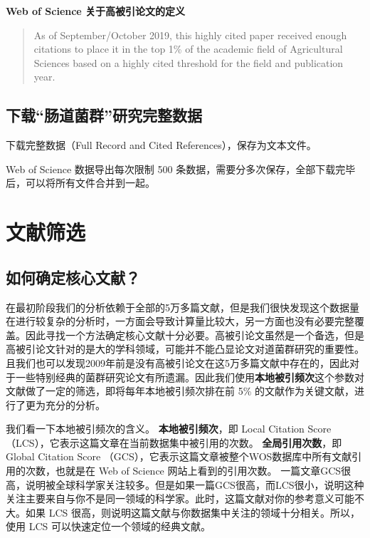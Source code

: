 \documentclass[]{ctexbook}
\begin{document}
\textbf{Web of Science 关于高被引论文的定义}

\begin{quote}
As of September/October 2019, this highly cited paper received enough citations to place it in the top 1\% of the academic field of Agricultural Sciences based on a highly cited threshold for the field and publication year.
\end{quote}

\hypertarget{ux4e0bux8f7dux80a0ux9053ux83ccux7fa4ux7814ux7a76ux5b8cux6574ux6570ux636e}{%
\section{下载``肠道菌群''研究完整数据}\label{ux4e0bux8f7dux80a0ux9053ux83ccux7fa4ux7814ux7a76ux5b8cux6574ux6570ux636e}}

下载完整数据（Full Record and Cited References），保存为文本文件。

Web of Science 数据导出每次限制 500 条数据，需要分多次保存，全部下载完毕后，可以将所有文件合并到一起。

\hypertarget{core-article}{%
\chapter{文献筛选}\label{core-article}}

\hypertarget{ux5982ux4f55ux786eux5b9aux6838ux5fc3ux6587ux732e-1}{%
\section{如何确定核心文献？}\label{ux5982ux4f55ux786eux5b9aux6838ux5fc3ux6587ux732e-1}}

在最初阶段我们的分析依赖于全部的5万多篇文献，但是我们很快发现这个数据量在进行较复杂的分析时，一方面会导致计算量比较大，另一方面也没有必要完整覆盖。因此寻找一个方法确定核心文献十分必要。高被引论文虽然是一个备选，但是高被引论文针对的是大的学科领域，可能并不能凸显论文对道菌群研究的重要性。且我们也可以发现2009年前是没有高被引论文在这5万多篇文献中存在的，因此对于一些特别经典的菌群研究论文有所遗漏。因此我们使用\textbf{本地被引频次}这个参数对文献做了一定的筛选，即将每年本地被引频次排在前 5\% 的文献作为关键文献，进行了更为充分的分析。

我们看一下本地被引频次的含义。
\textbf{本地被引频次}，即 Local Citation Score（LCS），它表示这篇文章在当前数据集中被引用的次数。
\textbf{全局引用次数}，即 Global Citation Score （GCS），它表示这篇文章被整个WOS数据库中所有文献引用的次数，也就是在 Web of Science 网站上看到的引用次数。
一篇文章GCS很高，说明被全球科学家关注较多。但是如果一篇GCS很高，而LCS很小，说明这种关注主要来自与你不是同一领域的科学家。此时，这篇文献对你的参考意义可能不大。如果 LCS 很高，则说明这篇文献与你数据集中关注的领域十分相关。所以，使用 LCS 可以快速定位一个领域的经典文献。
\end{document}

